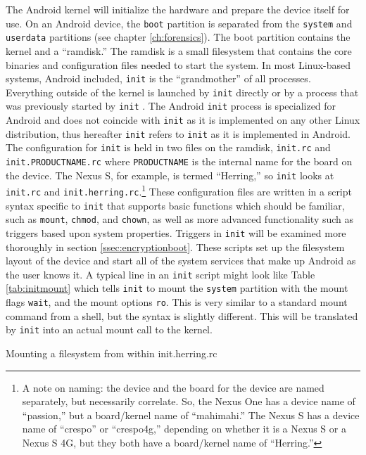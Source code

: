 The Android kernel will initialize the hardware and prepare the device itself for use. On an Android device, the \texttt{boot}
partition is separated from the \texttt{system} and \texttt{userdata} partitions (see chapter \ref{ch:forensics}). The boot
partition contains the kernel and a ``ramdisk.''  The ramdisk is a small filesystem that contains the core binaries and
configuration files needed to start the system. In most Linux-based systems, Android included, \texttt{init} is the ``grandmother''
of all processes. Everything outside of the kernel is launched by \texttt{init} directly or by a process that was
previously started by \texttt{init} \cite{eneaboot}. The Android \texttt{init} process is specialized for Android and does not coincide with
\texttt{init} as it is implemented on any other Linux distribution, thus hereafter \texttt{init} refers to \texttt{init} as it is
implemented in Android.  The configuration for \texttt{init} is held in two files on the ramdisk, \texttt{init.rc} and
\texttt{init.PRODUCTNAME.rc} where \texttt{PRODUCTNAME} is the internal name for the board on the device. The Nexus S, for example, is termed
``Herring,'' so \texttt{init} looks at \texttt{init.rc} and \texttt{init.herring.rc}.\footnote{A note on naming: the device and the
board for the device are named separately, but necessarily correlate. So, the Nexus One has a device name of ``passion,'' but a
board/kernel name of ``mahimahi.'' The Nexus S has a device name of ``crespo'' or ``crespo4g,'' depending on whether it is a Nexus S
or a Nexus S 4G, but they both have a board/kernel name of ``Herring.''} These configuration files are written in a script syntax
specific to \texttt{init} that supports basic functions which should be familiar, such as \texttt{mount}, \texttt{chmod}, and
\texttt{chown}, as well as more advanced functionality such as triggers based upon system properties.  Triggers in \texttt{init}
will be examined more thoroughly in section \ref{ssec:encryptionboot}. These scripts set up the filesystem layout of the device and
start all of the system services that make up Android as the user knows it. A typical line in an \texttt{init} script might look
like Table \ref{tab:initmount} which tells \texttt{init} to mount the \texttt{system} partition with the mount flags \texttt{wait}, and the mount
options \texttt{ro}. This is very similar to a standard mount command from a shell, but the syntax is slightly different. This will
be translated by \texttt{init} into an actual mount call to the kernel. 
\begin{table}[htb]

\caption{Mounting a filesystem from within init.herring.rc}
\label{tab:initmount}
\end{table}


